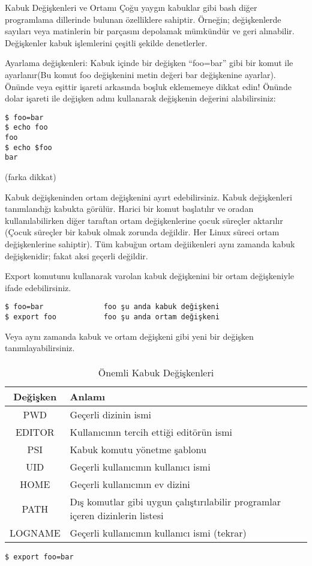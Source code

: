 \begin{section}{Kabuk Değişkenleri ve Ortamı}
\label{sec:bolum92}
Çoğu yaygın kabuklar gibi bash diğer programlama dillerinde bulunan özelliklere sahiptir. Örneğin; değişkenlerde sayıları veya matinlerin bir parçasını depolamak mümkündür ve geri alınabilir. Değişkenler kabuk işlemlerini çeşitli şekilde denetlerler.

Ayarlama değişkenleri: Kabuk içinde bir değişken “foo=bar” gibi bir komut ile ayarlanır(Bu komut foo değişkenini metin değeri bar değişkenine ayarlar). Önünde veya eşittir işareti arkasında boşluk eklememeye dikkat edin! Önünde dolar işareti ile değişken adını kullanarak değişkenin değerini alabilirsiniz:
\begin{verbatim}
$ foo=bar
$ echo foo
foo
$ echo $foo
bar
\end{verbatim} 
 
(farka dikkat)

Kabuk değişkeninden ortam değişkenini ayırt edebilirsiniz. Kabuk değişkenleri tanımlandığı kabukta görülür. Harici bir komut başlatılır ve oradan kullanılabilirken diğer taraftan ortam değişkenlerine çocuk süreçler aktarılır (Çocuk süreçler bir kabuk olmak zorunda değildir. Her Linux süreci ortam değişkenlerine sahiptir). Tüm kabuğun ortam değiikenleri aynı zamanda kabuk değişkenidir; fakat aksi geçerli değildir.

Export komutunu kullanarak varolan kabuk değişkenini bir ortam değişkeniyle ifade edebilirsiniz.
\begin{verbatim}
$ foo=bar              foo şu anda kabuk değişkeni
$ export foo           foo şu anda ortam değişkeni
\end{verbatim}

Veya aynı zamanda kabuk ve ortam değişkeni gibi yeni bir değişken tanımlayabilirsiniz.

\paragraph{}{
\begin {table}[H]
\caption {Önemli Kabuk Değişkenleri} \label{tab:title} 
\begin{tabular}{c l}
\hline
Değişken & Anlamı\\
\hline
PWD		&  Geçerli dizinin ismi\\
EDITOR		&  Kullanıcının tercih ettiği editörün ismi\\
PSI	&	  Kabuk komutu yönetme şablonu\\
UID		&  Geçerli kullanıcının kullanıcı ismi\\
HOME		&  Geçerli kullanıcının ev dizini\\
PATH		&  Dış komutlar gibi uygun çalıştırılabilir programlar içeren dizinlerin listesi\\
LOGNAME	  & Geçerli kullanıcının kullanıcı ismi (tekrar)\\
\hline
\end{tabular}
\end {table}}
\begin{verbatim}
$ export foo=bar
\end{verbatim}


\end{section}
